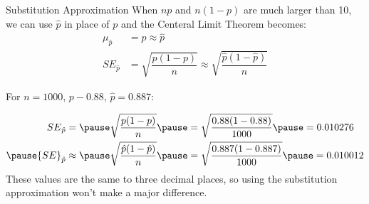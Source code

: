 \documentclass{beamer}
\begin{document}
\begin{frame}
  \begin{block}{Substitution Approximation}
    When $np$ and $n(1-p)$ are much larger than 10, we can use $\hat{p}$ in place of $p$ and the Centeral Limit Theorem becomes:
    \begin{equation*}
      \begin{aligned}
        \mu_{\hat{p}}&=p\approx \hat{p} \\
        {SE}_{\hat{p}}&=\sqrt{\dfrac{p(1-p)}{n}}\approx \sqrt{\dfrac{\hat{p}(1-\hat{p})}{n}}
      \end{aligned}
    \end{equation*}
  \end{block}\pause

  \begin{example}
    For $n=1000$, $p-0.88$, $\hat{p}=0.887$:

    \vspace{-2mm}
    \begin{equation*}
      \begin{aligned}
        {SE}_{\hat{p}}&=\pause
        \sqrt{\dfrac{p(1-p)}{n}} \pause
        = \sqrt{\dfrac{0.88(1-0.88)}{1000}}\pause
        = 0.010276 \\\pause
        {SE}_{\hat{p}}&\approx \pause
        \sqrt{\dfrac{\hat{p}(1-\hat{p})}{n}}\pause
        = \sqrt{\dfrac{0.887(1-0.887)}{1000}}\pause
        = 0.010012
      \end{aligned}
    \end{equation*}\pause
    These values are the same to three decimal places, so using the substitution approximation won't make a major difference.
  \end{example}
\end{frame}
\end{document}
